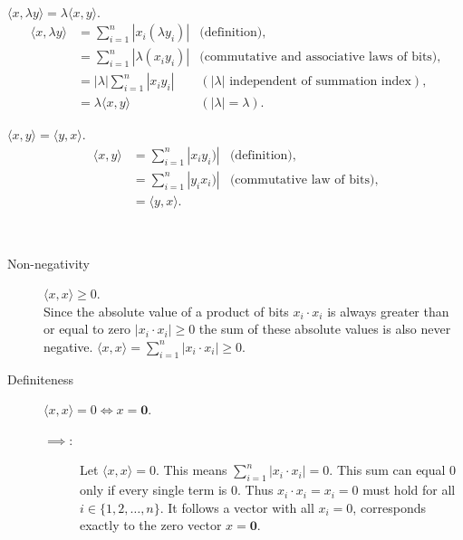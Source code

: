 \documentclass[a4paper]{article}
\newcommand{\0}{\mathbf{0}}
\newcommand{\1}{\mathbf{1}}
\begin{document}
\begin{description}
\begin{description}
\begin{equation*}
\begin{array}{rlr}
\end{array}
\end{equation*}
\item[Homogeneity in the second argument:]
\(\langle x, \lambda y \rangle = \lambda \langle x, y \rangle\).
\begin{equation*}
\begin{array}{rlr}
	\langle x, \lambda y \rangle & =\sum _{i=1}^{n} | x_i (\lambda y_i) |  & \text{(definition)}, \\
	& =\sum _{i=1}^{n} | \lambda (x_i y_i) | & \text{(commutative and associative laws of bits)}, \\
	& =|\lambda| \sum _{i=1}^{n} |x_i y_i | & (|\lambda| \text{ independent of summation index}), \\
	& = \lambda \langle x,y \rangle & (|\lambda| = \lambda).
\end{array}
\end{equation*}
\end{description}
\item[Commutativity]
$\langle x, y \rangle = \langle y, x \rangle$.
\begin{equation*}
\begin{array}{rlr}
	\langle x, y \rangle & =\sum _{i=1}^{n} | x_i y_i) |  & \text{(definition)}, \\
	& =\sum _{i=1}^{n} | y_i x_i) | & \text{(commutative law of bits)}, \\
	& =\langle y,x \rangle.
\end{array}
\end{equation*}
\item[Positive definiteness] \
\begin{description}
\item[Non-negativity] $\langle x, x\rangle \ge 0$. \\
Since the absolute value of a product of bits $x_i \cdot x_i$ is always greater than or equal to zero $|x_i \cdot x_i| \ge 0$ the
sum of these absolute values is also never negative. $\langle x, x\rangle  = \sum_{i=1}^{n} |x_i \cdot x_i| \ge 0$.
\item[Definiteness] $\langle x, x\rangle = 0 \Leftrightarrow x = \0$.
\begin{description}
\item[$\implies :$] Let $\langle x, x\rangle = 0$. This means $\sum_{i=1}^{n} |x_i \cdot x_i| = 0$.
This sum can equal $0$ only if every single term is $0$.
Thus $x_i \cdot x_i = x_i  = 0$ must hold for all $i \in \{1, 2, \dots, n\}$.
It follows a vector with all $x_i = 0$, corresponds exactly to the zero vector $x = \0$.

\end{description}
\end{description}
\end{description}
\end{document}
